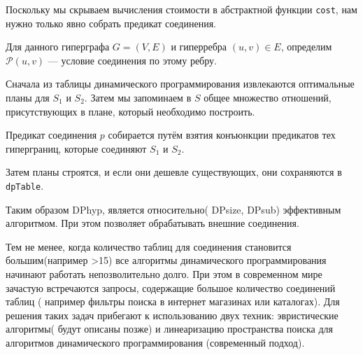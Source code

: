 \documentclass[12pt]{article}
\begin{document}
\begin{flushleft}
Поскольку мы скрываем вычисления стоимости  
в абстрактной функции \texttt{cost},  
нам нужно только явно собрать предикат соединения.  

Для данного гиперграфа $G = (V, E)$  
и гиперребра $(u, v) \in E$,  
определим $\mathcal{P}(u, v)$ —  
условие соединения по этому ребру.  

Сначала из таблицы динамического программирования  
извлекаются оптимальные планы для $S_1$ и $S_2$.  
Затем мы запоминаем в $S$ общее множество отношений,  
присутствующих в плане, который необходимо построить.  

Предикат соединения $p$ собирается  
путём взятия конъюнкции предикатов тех гиперграниц,  
которые соединяют $S_1$ и $S_2$.  

Затем планы строятся,  
и если они дешевле существующих,  
они сохраняются в \texttt{dpTable}.

Таким образом DPhyp, является относительно( DPsize, DPsub) эффективным алгоритмом.
При этом позволяет обрабатывать внешние соединения.

Тем не менее, когда количество таблиц для соединения становится большим(например >15) все алгоритмы динамического 
программирования начинают работать непозволительно долго. При этом в современном мире зачастую встречаются запросы, 
содержащие большое количество соединений таблиц ( например фильтры поиска в интернет магазинах или каталогах). Для решения 
таких задач прибегают к использованию двух техник: эвристические алгоритмы( будут описаны позже) и линеаризацию пространства 
поиска для алгоритмов динамического программирования (современный подход).
\end{flushleft}
\end{document}
